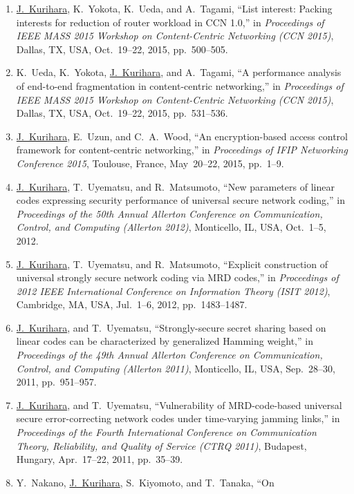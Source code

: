 \begin{enumerate}
 \item \underline{J.~Kurihara}, K.~Yokota, K.~Ueda, and A.~Tagami, ``List interest: Packing interests for reduction of router workload in CCN 1.0,'' in \textit{Proceedings of IEEE MASS 2015 Workshop on Content-Centric Networking (CCN 2015)}, Dallas, TX, USA, Oct.~19--22, 2015, pp.~500--505.
 \item K.~Ueda, K.~Yokota, \underline{J.~Kurihara}, and A.~Tagami, ``A performance analysis of end-to-end fragmentation in content-centric networking,'' in \textit{Proceedings of IEEE MASS 2015 Workshop on Content-Centric Networking (CCN 2015)}, Dallas, TX, USA, Oct.~19--22, 2015, pp.~531--536.
 \item \underline{J.~Kurihara}, E.~Uzun, and C.~A.~Wood, ``An encryption-based access control framework for content-centric networking,'' in \textit{Proceedings of IFIP Networking Conference 2015}, Toulouse, France, May~20--22, 2015, pp.~1--9.
 \item \underline{J.~Kurihara}, T.~Uyematsu, and R.~Matsumoto, ``New
       parameters of linear codes expressing security performance of
       universal secure network coding,''
       in \textit{Proceedings of the 50th Annual Allerton
       Conference on Communication, Control, and Computing (Allerton
       2012)}, Monticello, IL, USA, Oct.~1--5, 2012.
 \item \underline{J.~Kurihara}, T.~Uyematsu, and R.~Matsumoto,
       ``Explicit construction of universal strongly secure network
       coding via MRD codes,''
       in \textit{Proceedings of 2012 IEEE International Conference on
       Information Theory (ISIT 2012)}, Cambridge, MA, USA, Jul.~1--6,
       2012, pp.~1483--1487.
 \item \underline{J.~Kurihara}, and T.~Uyematsu, ``Strongly-secure secret
       sharing based on linear codes can be characterized by generalized
       Hamming weight,'' in \textit{Proceedings of the 49th Annual Allerton
       Conference on Communication, Control, and Computing (Allerton
       2011)}, Monticello, IL, USA, Sep.~28--30, 2011, pp.~951--957.
 \item \underline{J.~Kurihara}, and T.~Uyematsu, ``Vulnerability of
       MRD-code-based universal secure error-correcting network codes
       under time-varying jamming links,'' in \textit{Proceedings of
       the Fourth International Conference on Communication Theory,
       Reliability, and Quality of Service (CTRQ 2011)}, Budapest,
       Hungary, Apr.~17--22, 2011, pp.~35--39.
 \item Y.~Nakano, \underline{J.~Kurihara}, S.~Kiyomoto, and T.~Tanaka, ``On

\end{enumerate}
